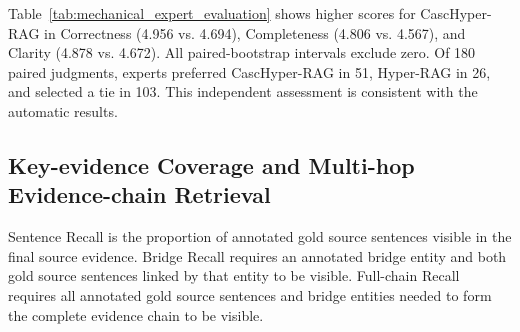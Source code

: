 \documentclass{article} %
\begin{document}
Table~\ref{tab:mechanical_expert_evaluation} shows higher scores for CascHyper-RAG in Correctness (4.956 vs. 4.694), Completeness (4.806 vs. 4.567), and Clarity (4.878 vs. 4.672). All paired-bootstrap intervals exclude zero. Of 180 paired judgments, experts preferred CascHyper-RAG in 51, Hyper-RAG in 26, and selected a tie in 103. This independent assessment is consistent with the automatic results.

\subsection{Key-evidence Coverage and Multi-hop Evidence-chain Retrieval}

\begin{table}[!htbp]
\centering
\caption{Evidence coverage on the frozen Mechanical evaluation set. Values in the three recall columns are CascHyper-RAG / Hyper-RAG. $\Delta$ is CascHyper-RAG minus Hyper-RAG, with 95\% paired-bootstrap confidence intervals.}
\label{tab:rq6_evidence_chain_retrieval}
\setlength{\tabcolsep}{2pt}
\footnotesize
\renewcommand{\arraystretch}{1.12}
\renewcommand{\arraystretch}{1}

\vspace{2pt}
\raggedright\footnotesize Sentence Recall is the proportion of annotated gold source sentences visible in the final source evidence. Bridge Recall requires an annotated bridge entity and both gold source sentences linked by that entity to be visible. Full-chain Recall requires all annotated gold source sentences and bridge entities needed to form the complete evidence chain to be visible.
\end{table}
\end{document}
